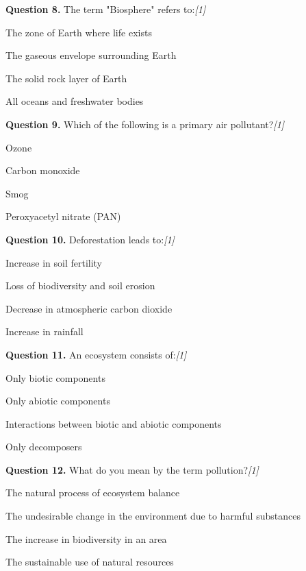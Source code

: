 \documentclass[11pt,a4paper]{article}
\newcommand{\pts}[1]{\hfill   \textit{[#1]}}
\begin{document}
\noindent   \textbf{Question 8.} The term "Biosphere" refers to:\pts{1}

\begin{parts}
  \item The zone of Earth where life exists
  \item The gaseous envelope surrounding Earth
  \item The solid rock layer of Earth
  \item All oceans and freshwater bodies
\end{parts}

\medskip


\noindent   \textbf{Question 9.} Which of the following is a primary air pollutant?\pts{1}

\begin{parts}
  \item Ozone
  \item Carbon monoxide
  \item Smog
  \item Peroxyacetyl nitrate (PAN)
\end{parts}

\medskip


\noindent   \textbf{Question 10.} Deforestation leads to:\pts{1}

\begin{parts}
  \item Increase in soil fertility
  \item Loss of biodiversity and soil erosion
  \item Decrease in atmospheric carbon dioxide
  \item Increase in rainfall
\end{parts}

\medskip


\noindent   \textbf{Question 11.} An ecosystem consists of:\pts{1}

\begin{parts}
  \item Only biotic components
  \item Only abiotic components
  \item Interactions between biotic and abiotic components
  \item Only decomposers
\end{parts}

\medskip


\noindent   \textbf{Question 12.} What do you mean by the term pollution?\pts{1}

\begin{parts}
  \item The natural process of ecosystem balance
  \item The undesirable change in the environment due to harmful substances
  \item The increase in biodiversity in an area
  \item The sustainable use of natural resources
\end{parts}
\end{document}

